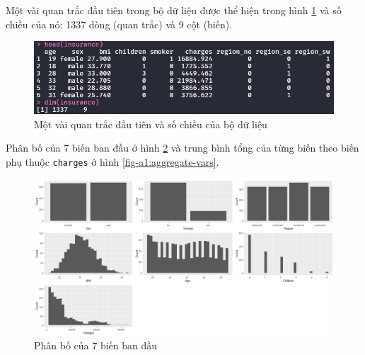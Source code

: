 Một vài quan trắc đầu tiên trong bộ dữ liệu được thể hiện trong hình \ref{fig-a1:head-dataset} và số chiều của nó: 1337 dòng (quan trắc) và 9 cột (biến).
\begin{figure}[H]
	\centering
	\includegraphics[width=0.9\linewidth]{images/A1/head-dataset}
	\caption{Một vài quan trắc đầu tiên và số chiều của bộ dữ liệu}
	\label{fig-a1:head-dataset}
\end{figure}

Phân bố của 7 biến ban đầu ở hình \ref{fig-a1:plot-vars} và trung bình tổng của từng biến theo biến phụ thuộc \texttt{charges} ở hình \ref{fig-a1:aggregate-vars}.
\begin{figure}[H]
	\centering
	\includegraphics[width=1\linewidth]{images/A1/plot-vars}
	\caption{Phân bố của 7 biến ban đầu}
	\label{fig-a1:plot-vars}
\end{figure}

